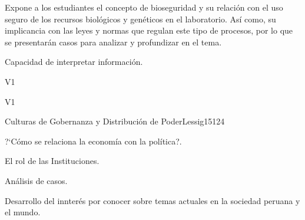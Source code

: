 \begin{syllabus}


\begin{justification}
Expone a los estudiantes el concepto de bioseguridad y su relación con el uso seguro de los recursos biológicos y genéticos en el laboratorio. Así como, su implicancia con las leyes y normas que regulan este tipo de procesos, por lo que se presentarán casos para analizar y profundizar en el tema.
\end{justification}

\begin{goals}
\item Capacidad de interpretar información.
\end{goals}

\begin{outcomes}{V1}
    \item {}
    \item {}
    \item {}
    
\end{outcomes}

\begin{competences}{V1}
    \item {}
    \item {}
    \item {}
    \item {}
\end{competences}

\begin{unit}{Culturas de Gobernanza y Distribución de Poder}{}{Lessig15}{12}{4}
   \begin{topics}
      \item ?`Cómo se relaciona la economía con la política?.
      \item El rol de las Instituciones.
      \item Análisis de casos.
   \end{topics}
   \begin{learningoutcomes}
      \item Desarrollo del innterés por conocer sobre temas actuales en la sociedad peruana y el mundo.
   \end{learningoutcomes}
\end{unit}

\begin{coursebibliography}
\end{coursebibliography}

\end{syllabus}
